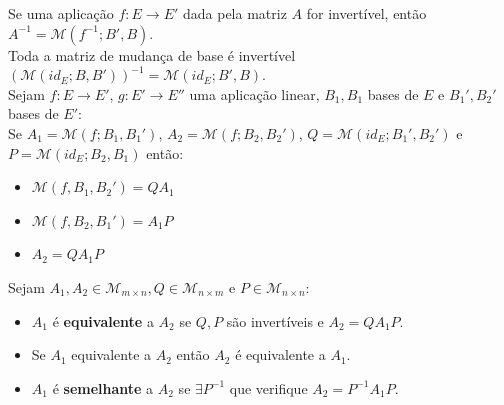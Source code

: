 \documentclass[]{report}
\begin{document}
Se uma aplicação $f: E \to E'$ dada pela matriz $A$ for invertível, então $A^{-1} = \mathcal{M}(f^{-1}; B', B)$.\\[5mm]
Toda a matriz de mudança de base é invertível $\left(\mathcal{M}(id_E; B, B')\right)^{-1} = \mathcal{M}(id_E; B', B)$.\\[5mm]
Sejam $f: E \to E'$, $g: E' \to E''$ uma aplicação linear, $B_1, B_1$ bases de $E$ e $B_1', B_2'$ bases de $E'$:\\
Se $A_1 = \mathcal{M}(f; B_1, B_1')$,  $A_2 = \mathcal{M}(f; B_2, B_2')$, $Q = \mathcal{M}(id_E; B_1', B_2')$ e  $P = \mathcal{M}(id_E; B_2, B_1)$ então:
\begin{itemize}
\item $\mathcal{M}(f, B_1, B_2') = QA_1$
\item $\mathcal{M}(f, B_2, B_1') = A_1P$
\item $A_2 = QA_1 P$
\end{itemize}
Sejam $A_1, A_2 \in \mathcal{M}_{m \times n}, Q \in \mathcal{M}_{n \times m}$ e $P \in \mathcal{M}_{n \times n}$:
\begin{itemize}
\item $A_1$ é \textbf{equivalente} a $A_2$ se $Q, P$ são invertíveis e $A_2 = QA_1P$.
\item Se $A_1$ equivalente a $A_2$ então $A_2$ é equivalente a $A_1$.
\item $A_1$ é \textbf{semelhante} a $A_2$ se $\exists P^{-1}$ que verifique $A_2 = P^{-1}A_1P$.
\end{itemize}
\clearpage
\end{document}

